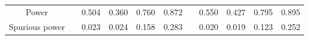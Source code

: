 % 
\begin{tabular}{ccccccccccc}
  \hline
  \hline
Power &  & 0.504 & 0.360 & 0.760 & 0.872 &  & 0.550 & 0.427 & 0.795 & 0.895 \\ 
  Spurious power &  & 0.023 & 0.024 & 0.158 & 0.283 &  & 0.020 & 0.019 & 0.123 & 0.252 \\ 
   \hline
\end{tabular}
